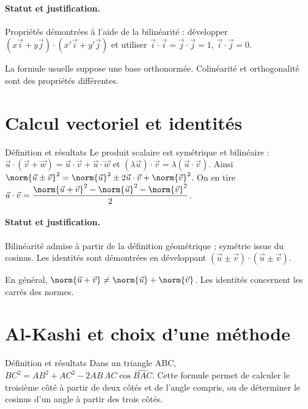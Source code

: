 \paragraph{Statut et justification.} Propriétés démontrées à l’aide de la bilinéarité : développer $(x\vec i+y\vec j)\cdot(x\prime\vec i+y\prime\vec j)$ et utiliser $\vec i\cdot\vec i=\vec j\cdot\vec j=1$, $\vec i\cdot\vec j=0$.
\label{C03-EX2}
\begin{erreur}La formule usuelle suppose une base orthonormée. Colinéarité et orthogonalité sont des propriétés différentes.\end{erreur}
\label{C03-AP2}
\section{Calcul vectoriel et identités}\label{C03-U3}
\begin{repere}{Définition et résultats}
Le produit scalaire est symétrique et bilinéaire : $\vec u\cdot(\vec v+\vec w)=\vec u\cdot\vec v+\vec u\cdot\vec w$ et $(\lambda\vec u)\cdot\vec v=\lambda(\vec u\cdot\vec v)$. Ainsi $\norm{\vec u\pm\vec v}^2=\norm{\vec u}^2\pm2\vec u\cdot\vec v+\norm{\vec v}^2$. On en tire $\vec u\cdot \vec v=\dfrac{\norm{\vec u+\vec v}^2-\norm{\vec u}^2-\norm{\vec v}^2}{2}$.
\end{repere}
\paragraph{Statut et justification.} Bilinéarité admise à partir de la définition géométrique ; symétrie issue du cosinus. Les identités sont démontrées en développant $(\vec u\pm\vec v)\cdot(\vec u\pm\vec v)$.
\label{C03-EX3}
\begin{erreur}En général, $\norm{\vec u+\vec v}\ne\norm{\vec u}+\norm{\vec v}$. Les identités concernent les carrés des normes.\end{erreur}
\label{C03-AP3}
\section{Al-Kashi et choix d’une méthode}\label{C03-U4}
\begin{repere}{Définition et résultats}
Dans un triangle ABC, $BC^2=AB^2+AC^2-2AB\,AC\cos\widehat{BAC}$. Cette formule permet de calculer le troisième côté à partir de deux côtés et de l’angle compris, ou de déterminer le cosinus d’un angle à partir des trois côtés.
\end{repere}
